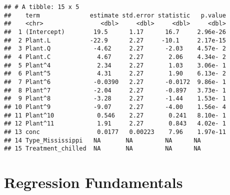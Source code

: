 \documentclass[
]{book}
\begin{document}
\begin{verbatim}
## # A tibble: 15 x 5
##    term              estimate std.error statistic   p.value
##    <chr>                <dbl>     <dbl>     <dbl>     <dbl>
##  1 (Intercept)        19.5      1.17      16.7     2.96e-26
##  2 Plant.L           -22.9      2.27     -10.1     2.17e-15
##  3 Plant.Q            -4.62     2.27      -2.03    4.57e- 2
##  4 Plant.C             4.67     2.27       2.06    4.34e- 2
##  5 Plant^4             2.34     2.27       1.03    3.06e- 1
##  6 Plant^5             4.31     2.27       1.90    6.13e- 2
##  7 Plant^6            -0.0390   2.27      -0.0172  9.86e- 1
##  8 Plant^7            -2.04     2.27      -0.897   3.73e- 1
##  9 Plant^8            -3.28     2.27      -1.44    1.53e- 1
## 10 Plant^9            -9.07     2.27      -4.00    1.56e- 4
## 11 Plant^10            0.546    2.27       0.241   8.10e- 1
## 12 Plant^11            1.91     2.27       0.843   4.02e- 1
## 13 conc                0.0177   0.00223    7.96    1.97e-11
## 14 Type_Mississippi   NA       NA         NA      NA       
## 15 Treatment_chilled  NA       NA         NA      NA
\end{verbatim}

\hypertarget{regress-fun}{%
\chapter{Regression Fundamentals}\label{regress-fun}}

\printbibliography
\end{document}
